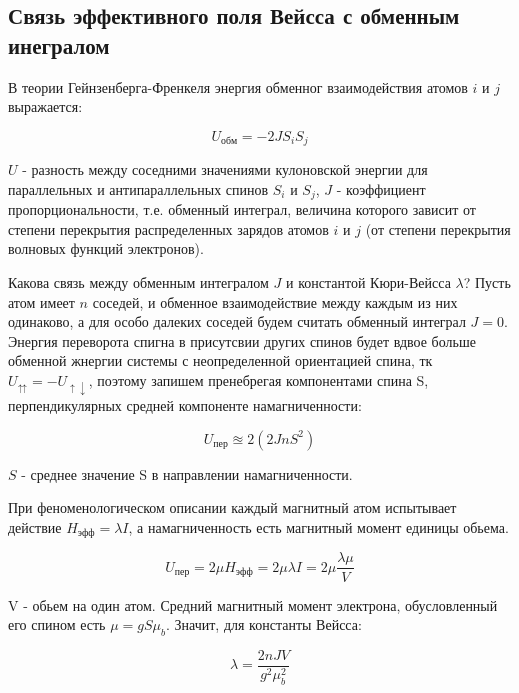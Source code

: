 \documentclass[a4paper]{article}
\begin{document}
\subsection{Связь эффективного поля Вейсса с обменным инегралом}

В теории Гейнзенберга-Френкеля энергия обменног взаимодействия атомов $i$ и $j$ выражается:

\begin{equation}
    U_{обм} = -2JS_iS_j
\end{equation}

$U$ - разность между соседними значениями кулоновской энергии для параллельных и антипараллельных спинов $S_i$ и $S_j$, $J$ - коэффициент пропорциональности, т.е. обменный интеграл, величина которого зависит от степени перекрытия распределенных зарядов атомов 
$i$ и $j$ (от степени перекрытия волновых функций электронов). \par 

Какова связь между обменным интегралом $J$ и константой Кюри-Вейсса $\lambda$?  Пусть атом имеет $n$ соседей, и обменное взаимодействие между каждым из них одинаково, а для особо далеких соседей будем считать 
обменный интеграл $J=0$. Энергия переворота спигна в присутсвии других спинов будет вдвое больше обменной жнергии системы  с неопределенной ориентацией спина, тк $U_{\upuparrows} = -U_{\uparrow \downarrow}$, поэтому запишем пренебрегая компонентами 
спина S, перпендикулярных средней компоненте намагниченности:

\begin{equation}
    U_{пер} \approxeq 2(2JnS^2)
\end{equation}

$S$ - среднее значение S в направлении намагниченности. \par 

При феноменологическом описании каждый магнитный атом испытывает действие $H_{эфф} = \lambda I$, а намагниченность есть магнитный момент единицы обьема. 

\begin{equation}
    U_{пер} = 2\mu H_{эфф} = 2 \mu \lambda I = 2 \mu \frac{\lambda \mu}{V}
\end{equation}

V - обьем на один атом. Средний магнитный момент электрона, обусловленный его спином есть $\mu = g S \mu_b$. Значит, для константы Вейсса:

\begin{equation}
    \lambda = \frac{2 n J V}{g^2 \mu_b^2}
\end{equation}
\end{document}
